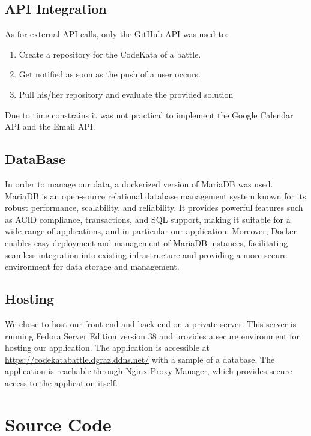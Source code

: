 \documentclass[table, 12pt]{article}
\begin{document}
\subsection{API Integration}
As for external API calls, only the GitHub API was used to:
\begin{enumerate}
    \item Create a repository for the CodeKata of a battle.
    \item Get notified as soon as the push of a user occurs.
    \item Pull his/her repository and evaluate the provided solution
\end{enumerate}
Due to time constrains it was not practical to implement the Google Calendar API and the Email API.

\subsection{DataBase}
In order to manage our data, a dockerized version of MariaDB was used. MariaDB is an open-source relational database management system known for its robust performance, scalability, and reliability. 
It provides powerful features such as ACID compliance, transactions, and SQL support, making it suitable for a wide range of applications, and in particular our application.
Moreover, Docker enables easy deployment and management of MariaDB instances, facilitating seamless integration into existing infrastructure and providing a more secure environment for data storage and management.

\subsection{Hosting}
We chose to host our front-end and back-end on a private server. 
This server is running Fedora Server Edition version 38 and provides a secure environment for hosting our application.
The application is accessible at \url{https://codekatabattle.dgraz.ddns.net/} with a sample of a database.
The application is reachable through Nginx Proxy Manager, which provides secure access to the application itself.
\newpage

\section{Source Code}
\end{document}
